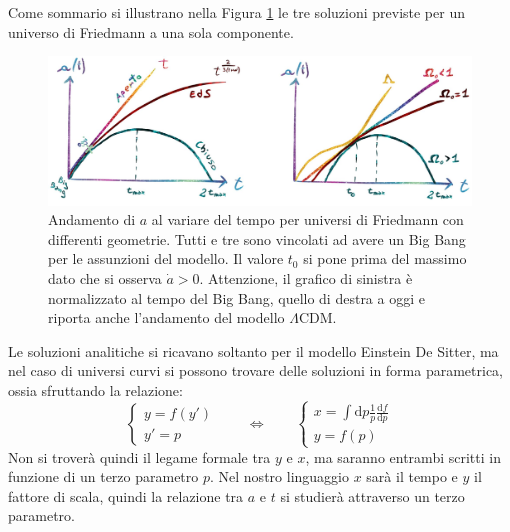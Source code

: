 Come sommario si illustrano nella Figura \ref{fig:2at} le tre soluzioni previste per un universo di Friedmann a una sola componente.
\begin{figure}[H]
    \centering
    \includegraphics[width=.95\textwidth]{Pictures/2/modellia-t.jpg}
    \caption{Andamento di $a$ al variare del tempo per universi di Friedmann con differenti geometrie. Tutti e tre sono vincolati ad avere un Big Bang per le assunzioni del modello. Il valore $t_0$ si pone prima del massimo dato che si osserva $\dot{a}>0$. Attenzione, il grafico di sinistra è normalizzato al tempo del Big Bang, quello di destra a oggi e riporta anche l'andamento del modello $\Lambda$CDM.}
    \label{fig:2at}
\end{figure}

Le soluzioni analitiche  si ricavano soltanto per il modello Einstein De Sitter, ma nel caso di universi curvi si possono trovare delle soluzioni in forma parametrica, ossia sfruttando la relazione: 
$$
\left\{\begin{matrix}
y= f(y')\\ 
y'=p
\end{matrix}\right. \qquad \Leftrightarrow \qquad 
\left\{\begin{matrix}
x= \int \mathrm{d}p \frac{1}{p}\frac{\mathrm{d} f}{\mathrm{d} p}\\ 
y=f(p)
\end{matrix}\right.
$$
Non si troverà quindi il legame formale tra $y$ e $x$, ma saranno entrambi scritti in funzione di un terzo parametro $p$. Nel nostro linguaggio $x$ sarà il tempo e $y$ il fattore di scala, quindi la relazione tra $a$ e $t$ si studierà attraverso un terzo parametro.

